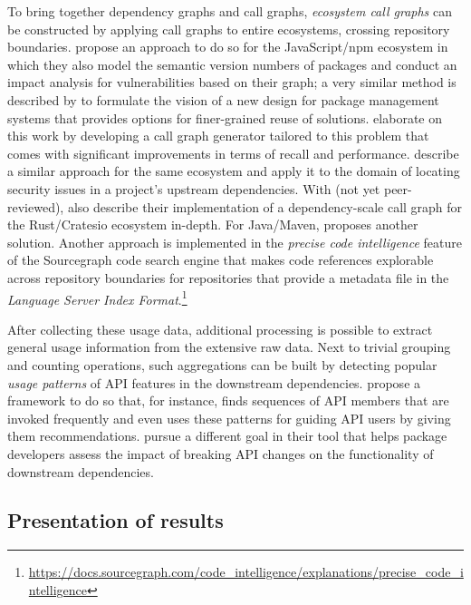 To bring together dependency graphs and call graphs, \emph{ecosystem call graphs} can be constructed by applying call graphs to entire ecosystems, crossing repository boundaries.
\citet{hejderup2018software} propose an approach to do so for the JavaScript/npm ecosystem in which they also model the semantic version numbers of packages and conduct an impact analysis for vulnerabilities based on their graph; a very similar method is described by \citet{boldi2020fine} to formulate the vision of a new design for package management systems that provides options for finer-grained reuse of solutions.
\citet{nielsen2021modular} elaborate on this work by developing a call graph generator tailored to this problem that comes with significant improvements in terms of recall and performance.
\citet{wang2020empirical} describe a similar approach for the same ecosystem and apply it to the domain of locating security issues in a project's upstream dependencies.
With  (not yet peer-reviewed), \citet{hejderup2021praezi} also describe their implementation of a dependency-scale call graph for the Rust/Cratesio ecosystem in-depth.
For Java/Maven, \citet{keshani2021scalable} proposes another solution.
Another approach is implemented in the \emph{precise code intelligence} feature of the Sourcegraph code search engine that makes code references explorable across repository boundaries for repositories that provide a metadata file in the \emph{Language Server Index Format}.\footnote{\url{https://docs.sourcegraph.com/code_intelligence/explanations/precise_code_intelligence}}

After collecting these usage data, additional processing is possible to extract general usage information from the extensive raw data.
Next to trivial grouping and counting operations, such aggregations can be built by detecting popular \emph{usage patterns} of API features in the downstream dependencies.
\citet{zhong2009mapo} propose a framework to do so that, for instance, finds sequences of API members that are invoked frequently and even uses these patterns for guiding API users by giving them recommendations.
\citet{hanam2019aiding} pursue a different goal in their tool that helps package developers assess the impact of breaking API changes on the functionality of downstream dependencies.

\subsection{Presentation of results}
\label{sec:related_work/presentation}

